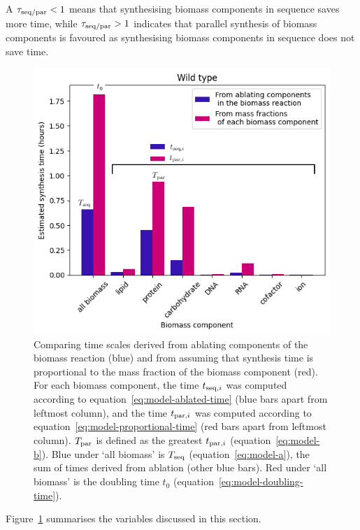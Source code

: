A $\tau_{\mathrm{seq}/\mathrm{par}} < 1$ means that synthesising biomass components in sequence saves more time, while $\tau_{\mathrm{seq}/\mathrm{par}} > 1$ indicates that parallel synthesis of biomass components is favoured as synthesising biomass components in sequence does not save time.

\begin{figure}
  \centering
  \includegraphics[width=.9\linewidth]{ablation_example_adapted.png}
  \caption{
    Comparing time scales derived from ablating components of the biomass reaction (blue) and from assuming that synthesis time is proportional to the mass fraction of the biomass component (red).
    For each biomass component, the time $t_{\mathrm{seq},i}$ was computed according to equation~\ref{eq:model-ablated-time} (blue bars apart from leftmost column), and the time $t_{\mathrm{par},i}$ was computed according to equation~\ref{eq:model-proportional-time} (red bars apart from leftmost column).
    $T_{\mathrm{par}}$ is defined as the greatest $t_{\mathrm{par},i}$ (equation~\ref{eq:model-b}).
    Blue under `all biomass' is $T_{\mathrm{seq}}$ (equation~\ref{eq:model-a}), the sum of times derived from ablation (other blue bars).
    Red under `all biomass' is the doubling time $t_{0}$ (equation~\ref{eq:model-doubling-time}).
  }
  \label{fig:model-ablate-times}
\end{figure}

Figure~\ref{fig:model-ablate-times} summarises the variables discussed in this section.

